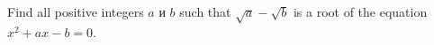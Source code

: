 \problem
Find all positive integers $a$ и $b$ such that $\sqrt{a} - \sqrt{b}$ is a root
of the equation $x^2 + a x - b = 0$.
\solution
\endproblem

